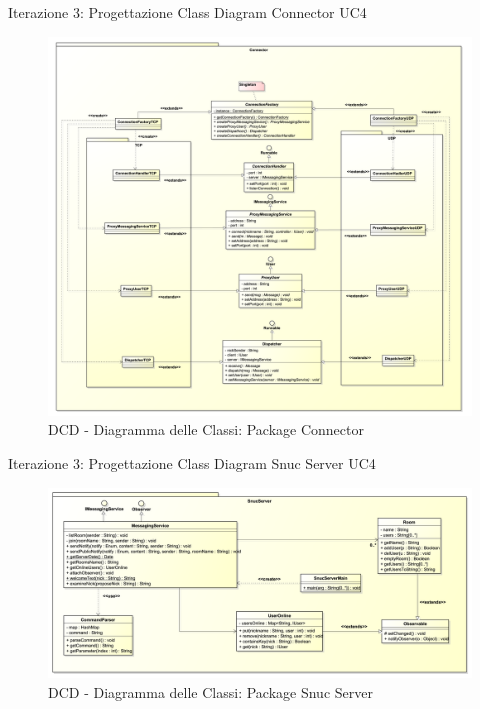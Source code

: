 \begin{frame} {Iterazione 3: Progettazione Class Diagram Connector UC4}
   \begin{figure}
     \includegraphics[scale=0.077]{image_astah/Iteration_3_DesignModel/ClassDiagramConnector.png}{\centering}
     \caption{DCD - Diagramma delle Classi: Package Connector }
     \label{fig_UC4_DCD_4} 
   \end{figure}
\end{frame}

\begin{frame} {Iterazione 3: Progettazione Class Diagram Snuc Server UC4}
   \begin{figure}
     \includegraphics[scale=0.155]{image_astah/Iteration_3_DesignModel/ClassDiagramSnucServer.png}{\centering}
     \caption{DCD - Diagramma delle Classi: Package Snuc Server }
     \label{fig_UC4_DCD_2} 
   \end{figure}
\end{frame}

